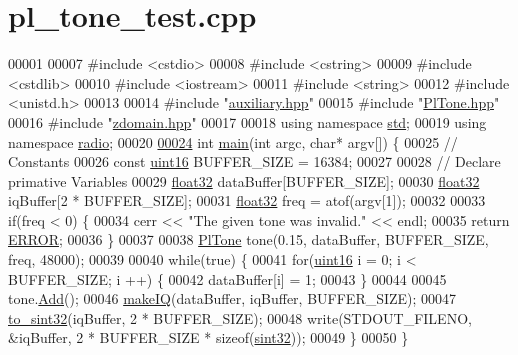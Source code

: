 \hypertarget{pl__tone__test_8cpp_source}{\section{pl\+\_\+tone\+\_\+test.\+cpp}
\label{pl__tone__test_8cpp_source}
}

\begin{DoxyCode}
00001 
00007 \textcolor{preprocessor}{#include <cstdio>}
00008 \textcolor{preprocessor}{#include <cstring>}
00009 \textcolor{preprocessor}{#include <cstdlib>}
00010 \textcolor{preprocessor}{#include <iostream>}
00011 \textcolor{preprocessor}{#include <string>}
00012 \textcolor{preprocessor}{#include <unistd.h>}
00013 
00014 \textcolor{preprocessor}{#include "\hyperlink{auxiliary_8hpp}{auxiliary.hpp}"}
00015 \textcolor{preprocessor}{#include "\hyperlink{PlTone_8hpp}{PlTone.hpp}"}
00016 \textcolor{preprocessor}{#include "\hyperlink{zdomain_8hpp}{zdomain.hpp}"}
00017 
00018 \textcolor{keyword}{using namespace }\hyperlink{namespacestd}{std};
00019 \textcolor{keyword}{using namespace }\hyperlink{namespaceradio}{radio};
00020 
\hypertarget{pl__tone__test_8cpp_source_l00024}{}\hyperlink{pl__tone__test_8cpp_a0ddf1224851353fc92bfbff6f499fa97}{00024} \textcolor{keywordtype}{int} \hyperlink{pl__tone__test_8cpp_a0ddf1224851353fc92bfbff6f499fa97}{main}(\textcolor{keywordtype}{int} argc, \textcolor{keywordtype}{char}* argv[]) \{
00025     \textcolor{comment}{// Constants}
00026     \textcolor{keyword}{const} \hyperlink{definitions_8hpp_a05f6b0ae8f6a6e135b0e290c25fe0e4e}{uint16} BUFFER\_SIZE = 16384;
00027 
00028     \textcolor{comment}{// Declare primative Variables}
00029     \hyperlink{definitions_8hpp_aacdc525d6f7bddb3ae95d5c311bd06a1}{float32} dataBuffer[BUFFER\_SIZE];
00030     \hyperlink{definitions_8hpp_aacdc525d6f7bddb3ae95d5c311bd06a1}{float32} iqBuffer[2 * BUFFER\_SIZE];
00031     \hyperlink{definitions_8hpp_aacdc525d6f7bddb3ae95d5c311bd06a1}{float32} freq = atof(argv[1]);
00032 
00033     \textcolor{keywordflow}{if}(freq < 0) \{
00034         cerr << \textcolor{stringliteral}{"The given tone was invalid."} << endl;
00035         \textcolor{keywordflow}{return} \hyperlink{definitions_8hpp_a8fe83ac76edc595f6b98cd4a4127aed5}{ERROR};
00036     \}
00037 
00038     \hyperlink{classradio_1_1PlTone}{PlTone} tone(0.15, dataBuffer, BUFFER\_SIZE, freq, 48000);
00039 
00040     \textcolor{keywordflow}{while}(\textcolor{keyword}{true}) \{
00041         \textcolor{keywordflow}{for}(\hyperlink{definitions_8hpp_a05f6b0ae8f6a6e135b0e290c25fe0e4e}{uint16} i = 0; i < BUFFER\_SIZE; i ++) \{
00042             dataBuffer[i] = 1;
00043         \}
00044         
00045         tone.\hyperlink{classradio_1_1PlTone_a9e19b2d5106b35626d4839f04f9b9f95}{Add}();
00046         \hyperlink{namespaceradio_a7166522e76ff88e8d482491b1b6e2275}{makeIQ}(dataBuffer, iqBuffer, BUFFER\_SIZE);
00047         \hyperlink{namespaceradio_ae4b2334c4366dcdf0311ad79d2067945}{to\_sint32}(iqBuffer, 2 * BUFFER\_SIZE);
00048         write(STDOUT\_FILENO, &iqBuffer, 2 * BUFFER\_SIZE * \textcolor{keyword}{sizeof}(\hyperlink{definitions_8hpp_a0573de65958b4fda3a0460ed417dafb8}{sint32}));
00049     \}
00050 \}
\end{DoxyCode}
